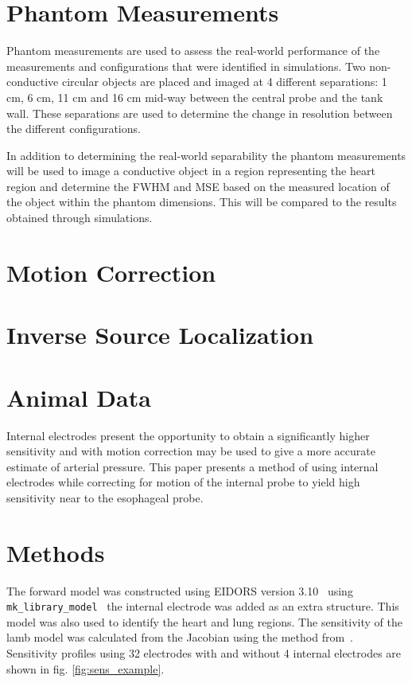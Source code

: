 \section{Phantom Measurements}
Phantom measurements are used to assess the real-world performance 
of the measurements and configurations 
that were identified in simulations. Two non-conductive circular 
objects are placed and imaged at 4 different separations: 
1 cm, 6 cm, 11 cm and 16 cm 
mid-way between the central probe and the tank wall. 
These separations are used to determine the change 
in resolution between the different configurations. 

In addition to determining the real-world separability the phantom measurements will be used to image a conductive object in a region 
representing the heart region and determine the FWHM and MSE based on the measured location of the object within the phantom dimensions. 
This will be compared to the results obtained through simulations.

\section{Motion Correction}

\section{Inverse Source Localization}

\section{Animal Data}

Internal electrodes present the opportunity to obtain
a significantly higher sensitivity and with motion correction 
may be used to give a more accurate estimate of arterial pressure.
This paper presents a method of using internal electrodes
while correcting for motion of the internal probe to yield 
high sensitivity near to the esophageal probe.

\section{Methods}
The forward model was constructed using EIDORS version 
3.10~\cite{Adler2019} using \verb!mk_library_model!~\cite{Grychtol2012} 
the internal electrode was added
as an extra structure. This model was also used
to identify the heart and lung regions.
The sensitivity of the lamb model was calculated from 
the Jacobian using 
the method from~\cite{Stowe2020}.
Sensitivity profiles using 32 electrodes with
and without 4 internal electrodes
are shown in fig. \ref{fig:sens_example}.

